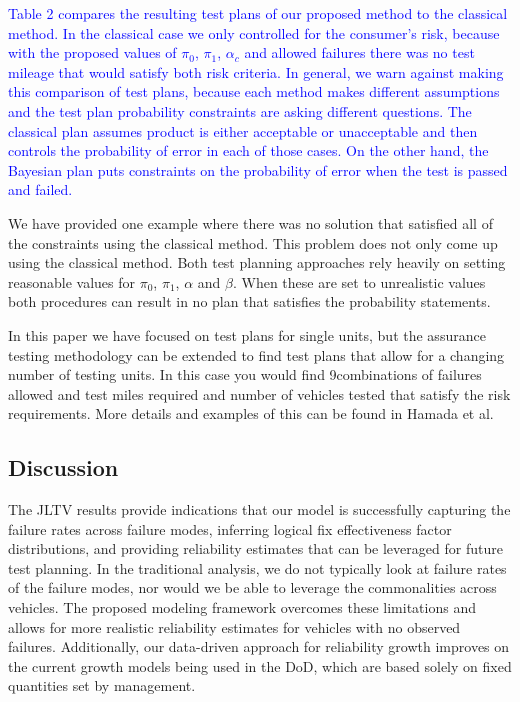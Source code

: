 \documentclass[12pt]{article}
\begin{document}
\textcolor{blue}{Table 2 compares the resulting test plans of our proposed method to the classical method.  In the classical case we only controlled for the consumer's risk, because with the proposed values of  $\pi_0$, $\pi_1$, $\alpha_c$ and allowed failures there was no test mileage that would satisfy both risk criteria.  In general, we warn against making this comparison of test plans, because each method makes different assumptions and the test plan probability constraints are asking different questions.  The classical plan assumes product is either acceptable or unacceptable and then controls the probability of error in each of those cases.  On the other hand, the Bayesian plan puts constraints on the probability of error when the test is passed and failed.}

We have provided one example where there was no solution that satisfied all of the constraints using the classical method.
This problem does not only come up using the classical method.  Both test planning approaches rely heavily on setting reasonable values for $\pi_0$, $\pi_1$, $\alpha$ and $\beta$.   When these are set to unrealistic values both procedures can result in no plan that satisfies the probability statements. ~\cite{ref9}

In this paper we have focused on test plans for single units, but the assurance testing methodology can be extended to find test plans that
allow for a changing number of testing units.  In this case you would find
9combinations of failures allowed and test miles required and number of vehicles
tested that satisfy the risk requirements. More details and examples of this can
be found in Hamada et al. ~\cite{ref4}

\subsection{Discussion}
The JLTV results provide indications that our model is successfully
capturing the failure rates across failure modes, inferring logical fix
effectiveness factor distributions, and providing reliability estimates that can
be leveraged for future test planning. In the traditional analysis, we do not
typically look at failure rates of the failure modes, nor would we be able to
leverage the commonalities across vehicles. The proposed modeling framework
overcomes these limitations and allows for more realistic reliability estimates
for vehicles with no observed failures. Additionally, our data-driven approach
for reliability growth improves on the current growth models being used in the
DoD, which are based solely on fixed quantities set by management.
\end{document}
